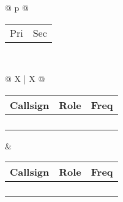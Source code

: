 \begin{adjustbox}{width={\textwidth},totalheight={\textheight}}
{\begin{tabularx}{\textwidth}{ @{} p{\linewidth} @{} }
	\\[-3ex] \midrule
	{\begin{tabularx}{\textwidth}{@{} *{2}X @{}}
		Pri & Sec\\[-3ex]
	\end{tabularx}}\\ \midrule
	{\begin{tabularx}{\textwidth}{@{} X | X @{}}
		{\begin{tabularx}{\linewidth}{@{} *{3}X @{}}
			Callsign & Role & Freq\\[-3ex] \midrule
			\hfill & \hfill & \hfill\\ \midrule
			\hfill & \hfill & \hfill\\ \midrule
			\hfill & \hfill & \hfill\\ \midrule
			\hfill & \hfill & \hfill\\
		\end{tabularx}} &
		{\begin{tabularx}{\linewidth}{@{} *{3}X @{}}
			Callsign & Role & Freq\\[-3ex] \midrule	
			\hfill & \hfill & \hfill\\ \midrule
			\hfill & \hfill & \hfill\\ \midrule
			\hfill & \hfill & \hfill\\ \midrule
			\hfill & \hfill & \hfill\\
		\end{tabularx}}\\
	\end{tabularx}}\\ \midrule
	

\end{tabularx}}
\end{adjustbox}
